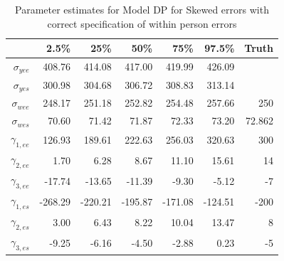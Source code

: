 \documentclass[11pt]{article}\usepackage[]{graphicx}\usepackage[]{color}
\begin{document}
\begin{table}[ht]
\centering
\begin{tabular}{rrrrrr|r}
  \hline
 & 2.5\% & 25\% & 50\% & 75\% & 97.5\% & Truth \\
  \hline
$\sigma_{yee}$ & 408.76 & 414.08 & 417.00 & 419.99 & 426.09 \\ 
  $\sigma_{yes}$ & 300.98 & 304.68 & 306.72 & 308.83 & 313.14 \\ 
  $\sigma_{wee}$ & 248.17 & 251.18 & 252.82 & 254.48 & 257.66 & 250 \\ 
  $\sigma_{wes}$ & 70.60 & 71.42 & 71.87 & 72.33 & 73.20 & 72.862 \\ 
  $\gamma_{1,ee}$ & 126.93 & 189.61 & 222.63 & 256.03 & 320.63 & 300 \\ 
  $\gamma_{2,ee}$ & 1.70 & 6.28 & 8.67 & 11.10 & 15.61 & 14 \\ 
  $\gamma_{3,ee}$ & -17.74 & -13.65 & -11.39 & -9.30 & -5.12 & -7 \\ 
  $\gamma_{1,es}$ & -268.29 & -220.21 & -195.87 & -171.08 & -124.51 & -200 \\ 
  $\gamma_{2,es}$ & 3.00 & 6.43 & 8.22 & 10.04 & 13.47 & 8 \\ 
  $\gamma_{3,es}$ & -9.25 & -6.16 & -4.50 & -2.88 & 0.23 & -5 \\ 
   \hline
\end{tabular}
\caption{Parameter estimates for Model DP for Skewed errors with correct specification of within person errors}
\label{mdpswpestimates}
\end{table}
\end{document}
